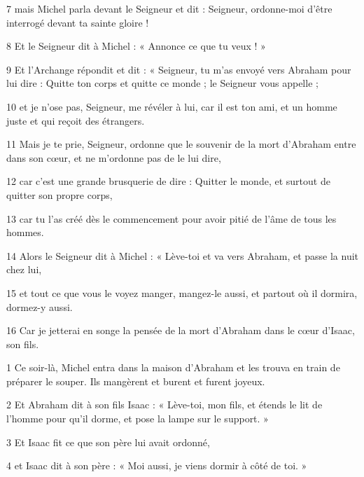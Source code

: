 \par 7 mais Michel parla devant le Seigneur et dit : Seigneur, ordonne-moi d'être interrogé devant ta sainte gloire !

\par 8 Et le Seigneur dit à Michel : « Annonce ce que tu veux ! »

\par 9 Et l'Archange répondit et dit : « Seigneur, tu m'as envoyé vers Abraham pour lui dire : Quitte ton corps et quitte ce monde ; le Seigneur vous appelle ;

\par 10 et je n'ose pas, Seigneur, me révéler à lui, car il est ton ami, et un homme juste et qui reçoit des étrangers.

\par 11 Mais je te prie, Seigneur, ordonne que le souvenir de la mort d'Abraham entre dans son cœur, et ne m'ordonne pas de le lui dire,

\par 12 car c'est une grande brusquerie de dire : Quitter le monde, et surtout de quitter son propre corps,

\par 13 car tu l'as créé dès le commencement pour avoir pitié de l'âme de tous les hommes.

\par 14 Alors le Seigneur dit à Michel : « Lève-toi et va vers Abraham, et passe la nuit chez lui,

\par 15 et tout ce que vous le voyez manger, mangez-le aussi, et partout où il dormira, dormez-y aussi.

\par 16 Car je jetterai en songe la pensée de la mort d'Abraham dans le cœur d'Isaac, son fils.


\par 1 Ce soir-là, Michel entra dans la maison d'Abraham et les trouva en train de préparer le souper. Ils mangèrent et burent et furent joyeux.

\par 2 Et Abraham dit à son fils Isaac : « Lève-toi, mon fils, et étends le lit de l'homme pour qu'il dorme, et pose la lampe sur le support. »

\par 3 Et Isaac fit ce que son père lui avait ordonné,

\par 4 et Isaac dit à son père : « Moi aussi, je viens dormir à côté de toi. »

